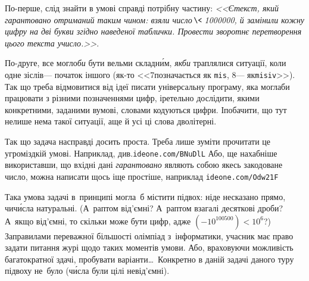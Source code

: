 \Tutorial	По-перше, слід знайти в умові справді потрібну частину: \textsl{<<Є\nolinebreak[3] текст, який гарантовано отриманий таким чином: взяли число$\dib{{\<}}$1000000, й замінили кожну цифру на дві букви згідно наведеної таблички. Провести зворотнє перетворення цього текста у\nolinebreak[3] число.>>}.

По-друге, все могло\nolinebreak[3] \emph{би} бути вельми складн\'{и}м, \emph{якби} траплялися ситуації, коли одне зі\nolinebreak[2] слів\nolinebreak[3] --- початок іншого (як-то <<7\nolinebreak[3] позначається як \texttt{mis}, 8\nolinebreak[3] --- як\nolinebreak[2] \texttt{misiv}>>). Так що треба відмовитися від ідеї писати універсальну програму, яка могла\nolinebreak[3] би працювати з різними позначеннями цифр, і\nolinebreak[3] ретельно дослідити, якими конкретними, заданими в\nolinebreak[3] умові, словами кодуються цифри. І\nolinebreak[3] побачити, що тут не\nolinebreak[3] лише нема такої ситуації, а\nolinebreak[3] ще й усі ці слова дволітерні. 

Так що задача насправді досить проста. Треба лише зуміти прочитати це у\nolinebreak[3] громіздкій умові. Наприклад, див.\nolinebreak[2] \verb"ideone.com/BNuDlL"\hspace{0.5em plus 1em} Або, ще нахабніше використавши, що вхідні дані \emph{гарантовано} являють собою якесь закодоване число, можна написати щось іще простіше, наприклад \verb"ideone.com/Odw21F"

Така умова задачі в~принципі могла~б містити підвох: ніде не\nolinebreak[3] сказано прямо, чи\nolinebreak[3] ч\'{и}сла натуральні. (А~раптом від'ємні? А~раптом взагалі десяткові дроби? А~якщо від'ємні, то скільки може бути цифр, адже ${({-}10^{100500}){<}10^6}$?) За\nolinebreak[3] правилами переважної більшості олімпіад з~інформатики, учасник має право задати питання журі щодо таких моментів умови. Або, враховуючи можливість багатократної здачі, пробувати варіанти\dots\ Конкретно в даній задачі даного туру підвоху не~було (ч\'{и}сла були цілі невід'ємні).